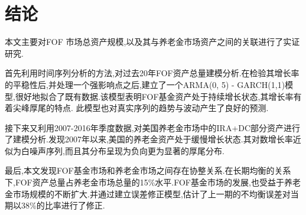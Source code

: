 
\section{结论}

本文主要对FOF 市场总资产规模,以及其与养老金市场资产之间的关联进行了实证研究.

首先利用时间序列分析的方法,对过去20年FOF资产总量建模分析.在检验其增长率的平稳性后,并处理一个强影响点之后,建立了一个ARMA(0, 5) - GARCH(1,1)模型,很好地拟合了既有数据.该模型表明FOF基金资产处于持续增长状态,其增长率有着尖峰厚尾的特点. 此模型也对真实序列的趋势与波动产生了良好的预测.

接下来又利用2007-2016年季度数据,对美国养老金市场中的IRA+DC部分资产进行了建模分析.发现2007年以来,美国的养老金资产处于缓慢增长状态.其对数增长率近似为白噪声序列,而且其分布呈现为负向更为显著的厚尾分布.

最后,本文发现FOF基金市场和养老金市场之间存在协整关系.在长期均衡的关系下,FOF资产总量占养老金市场总量的15\%水平.FOF基金市场的发展,也受益于养老金市场规模的不断扩大.并通过建立误差修正模型,估计了上一期的不均衡误差对当期以38\%的比率进行了修正.

\clearpage





